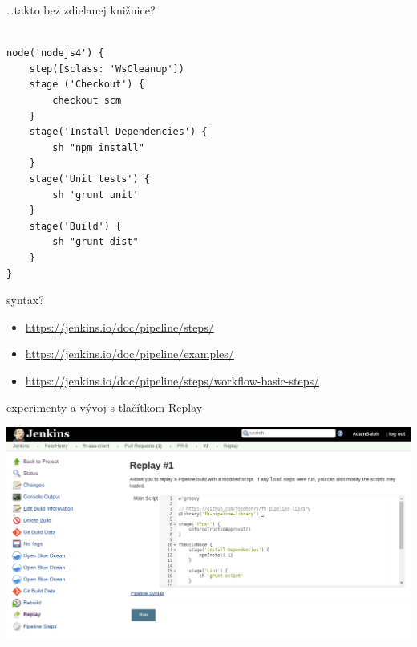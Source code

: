 \documentclass[bigger]{beamer}
\begin{document}
\begin{frame}[fragile,label={sec:org042d6dc}]{\ldots{}takto bez zdielanej knižnice?}
 \begin{verbatim}

node('nodejs4') {
    step([$class: 'WsCleanup'])
    stage ('Checkout') {
        checkout scm
    }
    stage('Install Dependencies') {
        sh "npm install"
    }
    stage('Unit tests') {
        sh 'grunt unit'
    }
    stage('Build') {
        sh "grunt dist"
    }
}
\end{verbatim}
\end{frame}

\begin{frame}[label={sec:org51e8ed5}]{syntax?}
\begin{itemize}
\item \url{https://jenkins.io/doc/pipeline/steps/}
\item \url{https://jenkins.io/doc/pipeline/examples/}
\item \url{https://jenkins.io/doc/pipeline/steps/workflow-basic-steps/}
\end{itemize}
\end{frame}

\begin{frame}[label={sec:orgb6dd0a0}]{experimenty a vývoj s tlačítkom Replay}
\begin{center}
\includegraphics[width=.9\linewidth]{./020replay.png}
\end{center}
\end{frame}
\end{document}

